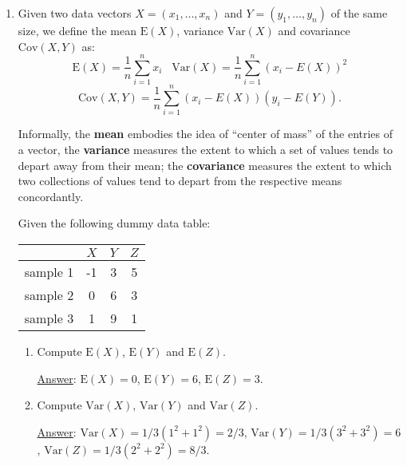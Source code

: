 \documentclass[]{book}
\theoremstyle{definition}
\newcommand\ans{\underline{Answer}: }
\begin{document}
\begin{enumerate}
\begin{enumerate}
\ans Yes, they are. The matrix $AA^t$ represents all the possible products $r_i^t r_j$ where $r_i$ are the 
rows of $A$.  The matrix $A^t A$ represents all the possible products $c_i^t c_j$ where $c_i$ are the 
columns of $A$. The symmetry of these matrices is just a consequence of the fact that $v^t w = w^t v$ 
for any  column vectors $v, w$ of the same size (see exercise below).
\end{enumerate}


\item
Given two data vectors $X=(x_1,\ldots,x_n)$ and $Y=(y_1, \ldots, y_n)$ of the same size, we define the mean $\textrm{E}(X)$, 
variance $\textrm{Var}(X)$ and covariance $\textrm{Cov}(X, Y)$ as:
\[
\textrm{E}(X)=\frac{1}{n}\sum_{i=1}^n x_i\;\;\; \textrm{Var}(X)=\frac{1}{n}\sum_{i=1}^n (x_i - E(X))^2
\]
\[
\textrm{Cov}(X, Y) = \frac{1}{n}\sum_{i=1}^n (x_i - E(X)) (y_i - E(Y)).
\]

Informally, the {\bf mean} embodies the idea of ``center of mass'' of the entries of a vector, the {\bf variance} 
measures the extent to which a set of values tends to depart away from their mean; the {\bf covariance}
measures the extent to which two collections of values tend to depart from the respective means concordantly.

Given the following dummy data table:

\begin{center}
\begin{tabular}{|c|c|c|c|}
\hline
 & $X$ & $Y$ & $Z$   \\
\hline
sample 1 &  -1  & 3  & 5 \\
sample 2 &  0 &   6 & 3 \\
sample 3 &  1 &   9 & 1 \\
\hline
\end{tabular}
\end{center}

\begin{enumerate}
\item Compute $\textrm{E}(X)$, $\textrm{E}(Y)$ and $\textrm{E}(Z)$.

\ans $\textrm{E}(X)=0$, $\textrm{E}(Y)=6$, $\textrm{E}(Z)=3$.

\item Compute $\textrm{Var}(X)$, $\textrm{Var}(Y)$ and $\textrm{Var}(Z)$.

\ans $\textrm{Var}(X) = 1/3 (1^2 + 1^2) = 2/3$, $\textrm{Var}(Y)=1/3 (3^2 + 3^2) = 6$, $\textrm{Var}(Z)=1/3 (2^2 + 2^2) = 8/3$.


\end{enumerate}
\end{enumerate}
\end{document}

